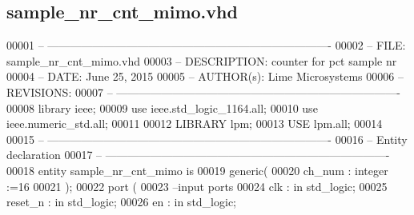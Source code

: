 \subsection{sample\+\_\+nr\+\_\+cnt\+\_\+mimo.\+vhd}
\label{sample__nr__cnt__mimo_8vhd_source}

\begin{DoxyCode}
00001 \textcolor{keyword}{-- ---------------------------------------------------------------------------- }
00002 \textcolor{keyword}{-- FILE:    sample\_nr\_cnt\_mimo.vhd}
00003 \textcolor{keyword}{-- DESCRIPTION: counter for pct sample nr}
00004 \textcolor{keyword}{-- DATE:    June 25, 2015}
00005 \textcolor{keyword}{-- AUTHOR(s):   Lime Microsystems}
00006 \textcolor{keyword}{-- REVISIONS:}
00007 \textcolor{keyword}{-- ---------------------------------------------------------------------------- }
00008 \textcolor{vhdlkeyword}{library }\textcolor{keywordflow}{ieee};
00009 \textcolor{vhdlkeyword}{use }ieee.std\_logic\_1164.\textcolor{keywordflow}{all};
00010 \textcolor{vhdlkeyword}{use }ieee.numeric\_std.\textcolor{keywordflow}{all};
00011 
00012 \textcolor{vhdlkeyword}{LIBRARY }\textcolor{keywordflow}{lpm};
00013 \textcolor{vhdlkeyword}{USE }\textcolor{keywordflow}{lpm.all};
00014 
00015 \textcolor{keyword}{-- ----------------------------------------------------------------------------}
00016 \textcolor{keyword}{-- Entity declaration}
00017 \textcolor{keyword}{-- ----------------------------------------------------------------------------}
00018 \textcolor{keywordflow}{entity }sample_nr_cnt_mimo \textcolor{keywordflow}{is}
00019   \textcolor{keywordflow}{generic}\textcolor{vhdlchar}{(}
00020           \textcolor{vhdlchar}{ch_num}         \textcolor{vhdlchar}{:} \textcolor{comment}{integer} \textcolor{vhdlchar}{:=}\textcolor{vhdllogic}{}\textcolor{vhdllogic}{16}
00021   \textcolor{vhdlchar}{)};
00022   \textcolor{keywordflow}{port} \textcolor{vhdlchar}{(}
00023 \textcolor{keyword}{        --input ports }
00024         \textcolor{vhdlchar}{clk}       \textcolor{vhdlchar}{:} \textcolor{keywordflow}{in} \textcolor{comment}{std\_logic};
00025         \textcolor{vhdlchar}{reset_n}   \textcolor{vhdlchar}{:} \textcolor{keywordflow}{in} \textcolor{comment}{std\_logic};
00026         \textcolor{vhdlchar}{en}        \textcolor{vhdlchar}{:} \textcolor{keywordflow}{in} \textcolor{comment}{std\_logic};

\end{DoxyCode}
